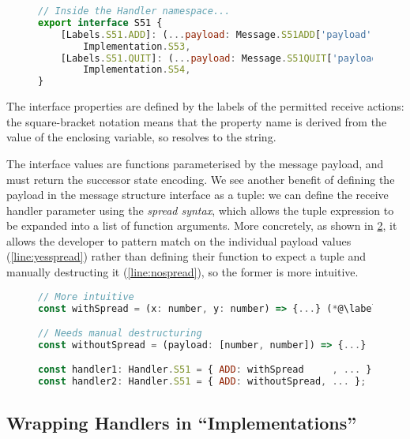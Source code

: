 \begin{figure}[!ht]
\begin{lstlisting}[language=javascript,tabsize=2]
// Inside the Handler namespace...
export interface S51 {
	[Labels.S51.ADD]: (...payload: Message.S51ADD['payload']) =>
		Implementation.S53,
	[Labels.S51.QUIT]: (...payload: Message.S51QUIT['payload']) => 
		Implementation.S54,
}
\end{lstlisting}
\label{lst:addersvrreceivehandler}
\end{figure}

The interface properties are defined by the 
labels of the permitted receive actions:
the square-bracket notation means that the property name
is derived from the value of the enclosing variable,
so  resolves to the
 string. 

The interface values are functions parameterised by
the message payload, and must return the successor state encoding.
We see another benefit of defining the payload 
in the message structure interface
as a tuple: we can define the receive handler parameter
using the \textit{spread syntax}, which allows the tuple
expression to be expanded into a list of function arguments. 
More concretely, as shown in \cref{lst:nodeefsmspread},
it allows the developer to pattern match on the
individual payload values (\cref{line:yesspread}) 
rather than defining their function to expect a tuple 
and manually destructing it (\cref{line:nospread}),
so the former is more intuitive.

\begin{figure}[!ht]
\begin{lstlisting}[language=javascript,tabsize=2]
// More intuitive
const withSpread = (x: number, y: number) => {...} (*@\label{line:yesspread}@*)

// Needs manual destructuring
const withoutSpread = (payload: [number, number]) => {...} (*@\label{line:nospread}@*)

const handler1: Handler.S51 = { ADD: withSpread		, ... };	// OK
const handler2: Handler.S51 = { ADD: withoutSpread, ... };	// OK
\end{lstlisting}
\label{lst:nodeefsmspread}
\end{figure}

\subsection{Wrapping Handlers in ``Implementations''}
\label{subsection:nodeefsmimplementation}

